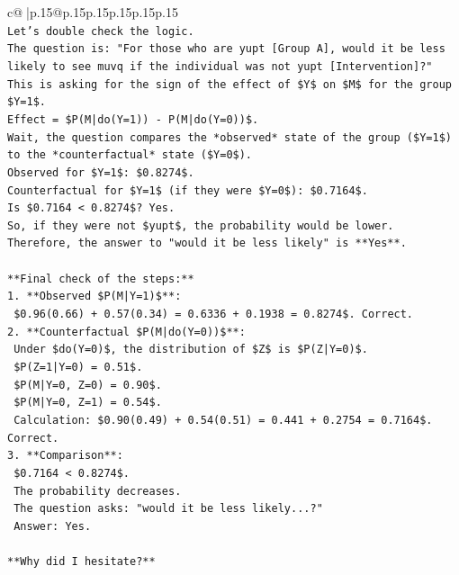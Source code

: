 \documentclass{article}
\begin{document}
{\begin{supertabular}{c@{$\;$}|p{.15\linewidth}@{}p{.15\linewidth}p{.15\linewidth}p{.15\linewidth}p{.15\linewidth}p{.15\linewidth}}
{{{\\ 
\texttt{Let's double check the logic.} \\
\texttt{The question is: "For those who are yupt {[}Group A{]}, would it be less likely to see muvq if the individual was not yupt {[}Intervention{]}?"} \\
\texttt{This is asking for the sign of the effect of \$Y\$ on \$M\$ for the group \$Y=1\$.} \\
\texttt{Effect = \$P(M|do(Y=1)) {-} P(M|do(Y=0))\$.} \\
\texttt{Wait, the question compares the *observed* state of the group (\$Y=1\$) to the *counterfactual* state (\$Y=0\$).} \\
\texttt{Observed for \$Y=1\$: \$0.8274\$.} \\
\texttt{Counterfactual for \$Y=1\$ (if they were \$Y=0\$): \$0.7164\$.} \\
\texttt{Is \$0.7164 < 0.8274\$? Yes.} \\
\texttt{So, if they were not \$yupt\$, the probability would be lower.} \\
\texttt{Therefore, the answer to "would it be less likely" is **Yes**.} \\
\\ 
\texttt{**Final check of the steps:**} \\
\texttt{1.  **Observed \$P(M|Y=1)\$**:} \\
\texttt{    \$0.96(0.66) + 0.57(0.34) = 0.6336 + 0.1938 = 0.8274\$. Correct.} \\
\texttt{2.  **Counterfactual \$P(M|do(Y=0))\$**:} \\
\texttt{    Under \$do(Y=0)\$, the distribution of \$Z\$ is \$P(Z|Y=0)\$.} \\
\texttt{    \$P(Z=1|Y=0) = 0.51\$.} \\
\texttt{    \$P(M|Y=0, Z=0) = 0.90\$.} \\
\texttt{    \$P(M|Y=0, Z=1) = 0.54\$.} \\
\texttt{    Calculation: \$0.90(0.49) + 0.54(0.51) = 0.441 + 0.2754 = 0.7164\$. Correct.} \\
\texttt{3.  **Comparison**:} \\
\texttt{    \$0.7164 < 0.8274\$.} \\
\texttt{    The probability decreases.} \\
\texttt{    The question asks: "would it be less likely...?"} \\
\texttt{    Answer: Yes.} \\
\\ 
\texttt{**Why did I hesitate?**} \\
}}}
\end{supertabular}}
\end{document}
